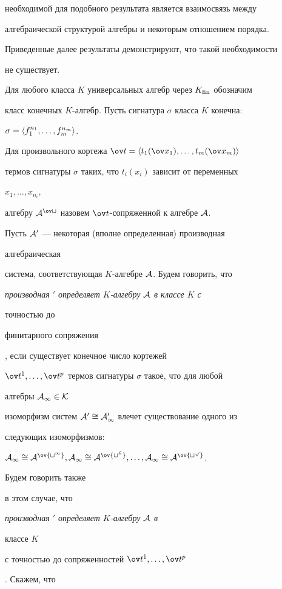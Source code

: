 необходимой для подобного результата является взаимосвязь между 


алгебраической структурой алгебры и некоторым отношением порядка. 


Приведенные далее результаты демонстрируют, что такой необходимости 


не существует. 


 


Для любого класса $K$ универсальных алгебр через $K_{\operatorname{fin}}$ обозначим 


класс конечных $K$-алгебр. Пусть сигнатура $\sigma$ класса $K$ конечна: 


$\sigma=\langle f^{n_1}_1,\dotsc,f^{n_m}_m\rangle$. 


Для произвольного кортежа $\ov t=\la t_1(\ov x_1),\dotsc,t_m(\ov 


x_m)\ra$ 


термов сигнатуры $\sigma$ таких, что $t_i(x_i)$ зависит от переменных 


$x_1,\dotsc,x_{n_i}$, 


алгебру $\cal A^{\ov t}$ назовем $\ov t$-сопряженной к алгебре $\cal A$. 


 


Пусть $\cal A'$ --- некоторая (вполне определенная) производная 


алгебраическая 


система, соответствующая $K$-алгебре $\cal A$. Будем говорить, что 


{\it производная $'$ определяет $K$-алгебру $\cal A$ в классе $K$ с 


точностью до 


финитарного сопряжения}, если существует конечное число кортежей 


$\ov t^1,\dotsc,\ov t^p$ термов сигнатуры $\sigma$ такое, что для любой 


алгебры $\cal A_1\in K$ 


изоморфизм систем $\cal A'\cong\cal A'_1$ влечет существование одного из 


следующих изоморфизмов: 


$\cal A_1\cong\cal A^{\ov{t^1}},\cal A_1\cong\cal 


A^{\ov{t^2}},\dotsc,\cal A_1\cong\cal A^{\ov{t^p}}$. 


Будем говорить также 


в этом случае, что {\it производная $'$ определяет $K$-алгебру $\cal A$ в 


классе $K$ 


с точностью до сопряженностей $\ov t^1,\dotsc,\ov t^p$}. Скажем, что 


